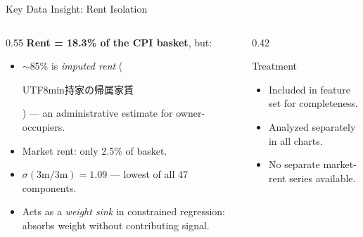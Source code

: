 \documentclass[aspectratio=169, 11pt]{beamer}
\begin{document}
\begin{frame}{Key Data Insight: Rent Isolation}
  \begin{columns}[T]
    \begin{column}{0.55\textwidth}
      \textbf{Rent = 18.3\% of the CPI basket}, but:
      \begin{itemize}
        \item $\sim$85\% is \emph{imputed rent} (\begin{CJK}{UTF8}{min}持家の帰属家賃\end{CJK}) --- an administrative estimate for owner-occupiers.
        \item Market rent: only 2.5\% of basket.
        \item $\sigma(\text{3m/3m}) = 1.09$ --- \alert{lowest} of all 47 components.
        \item Acts as a \emph{weight sink} in constrained regression: absorbs weight without contributing signal.
      \end{itemize}
    \end{column}
    \begin{column}{0.42\textwidth}
      \begin{block}{Treatment}
        \begin{itemize}
          \item Included in feature set for completeness.
          \item Analyzed separately in all charts.
          \item No separate market-rent series available.
        \end{itemize}
      \end{block}
    \end{column}
  \end{columns}
\end{frame}
\end{document}
